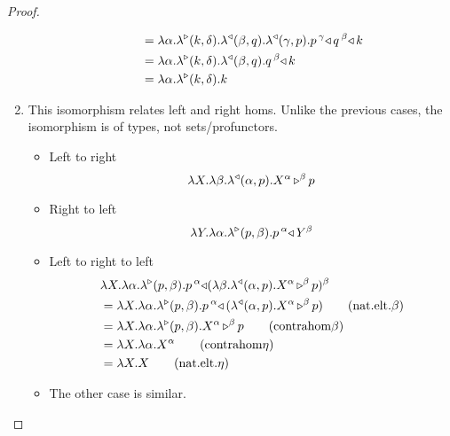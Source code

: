 \documentclass{llncs}
\begin{document}
\begin{proof}
\begin{enumerate}
\begin{itemize}
\begin{align*}
        &=\lambdaunary \alpha k \delta \homllambdaXatYdotZ q \beta \homllambdaXatYdotZ p \gamma {\homlappXtoYatZ {\homlappXtoYatZ k q \beta } p \gamma}\\
        &=\lambdaunary \alpha k \delta \homllambdaXatYdotZ q \beta { {\homlappXtoYatZ k q \beta}}\\
        &=\lambdaunary \alpha k \delta k\\
      \end{align*}
    \end{itemize}
  \item This isomorphism relates left and right homs. Unlike the
    previous cases, the isomorphism is of types, not sets/profunctors.
    \begin{itemize}
    \item Left to right
      \[\lambda X. \pendlambdaXdotY \beta \homllambdaXatYdotZ p \alpha {\appunary X \alpha p \beta}\]
    \item Right to left
      \[ \lambda Y. \pendlambdaXdotY \alpha \homrlambdaXatYdotZ p \beta {\homlappXtoYatZ {\pendappXtoY Y \beta} p \alpha} \]
    \item Left to right to left
      \begin{align*}
        &\lambda X. \pendlambdaXdotY \alpha \homrlambdaXatYdotZ p \beta {\homlappXtoYatZ {\pendappXtoY {(\pendlambdaXdotY \beta \homllambdaXatYdotZ p \alpha {\appunary X \alpha p \beta})} \beta} p \alpha}\\
        &= \lambda X. \pendlambdaXdotY \alpha \homrlambdaXatYdotZ p \beta {\homlappXtoYatZ { {(\homllambdaXatYdotZ p \alpha {\appunary X \alpha p \beta})}} p \alpha}\tag{nat.elt.$\beta$}\\
        &= \lambda X. \pendlambdaXdotY \alpha \homrlambdaXatYdotZ p \beta {\appunary X \alpha p \beta}\tag{contrahom$\beta$}\\
        &= \lambda X. \pendlambdaXdotY \alpha {\pendappXtoY X \alpha}\tag{contrahom$\eta$}\\
        &= \lambda X. X\tag{nat.elt.$\eta$}\\
      \end{align*}
    \item The other case is similar.
    \end{itemize}
  \end{enumerate}
\end{proof}
\end{document}

